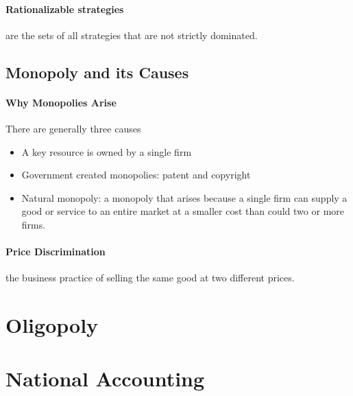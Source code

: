 \documentclass[a4paper,titlepage] {scrartcl}
\begin{document}
\paragraph{Rationalizable strategies} %
\label{par:rationalizable_strategies}
are the sets of all strategies that are not strictly dominated.


\subsection{Monopoly and its Causes} %
\label{sub:monopoly_and_its_causes}


\paragraph{Why Monopolies Arise} %
\label{par:why_monopolies_arise}
There are generally three causes
\begin{itemize}
	\item A key resource is owned by a single firm
	\item Government created monopolies: patent and copyright
	\item Natural monopoly: a monopoly that arises because a single firm can supply a good or service to an entire market at a smaller cost than could two or more firms.
\end{itemize}


\paragraph{Price Discrimination} %
\label{par:price_discrimination}
the business practice of selling the same good at two different prices.





\section{Oligopoly}



\section{National Accounting}
\end{document}
